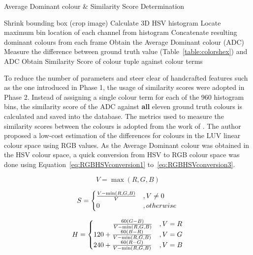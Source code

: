 \begin{algorithm}[H]
  \caption{Average Dominant colour \& Similarity Score Determination}
  \label{algo:ADC}
  \begin{algorithmic}[1]
        \STATE Shrink bounding box (crop image)
        \STATE Calculate 3D HSV histogram
        \STATE Locate maximum bin location of each channel from histogram
        \STATE Concatenate resulting dominant colours from each frame
        \STATE Obtain the Average Dominant colour (ADC)
        \STATE Measure the difference between ground truth value (Table~\ref{table:colorshex}) and ADC
        \STATE Obtain Similarity Score of colour tuple against colour terms
    \ENDFOR
  \end{algorithmic}
\end{algorithm}

To reduce the number of parameters and steer clear of handcrafted features such as the one introduced in Phase 1, the usage of similarity scores were adopted in Phase 2.
Instead of assigning a single colour term for each of the 960 histogram bins, the similarity score of the ADC against \textbf{all} eleven ground truth colours is calculated and saved into the database. The metrics used to measure the similarity scores between the colours is adopted from the work of . The author proposed a low-cost estimation of the differences for colours in the LUV linear colour space using RGB values. As the Average Dominant colour was obtained in the HSV colour space, a quick conversion from HSV to RGB colour space was done using Equation~\ref{eq:RGBHSVconversion1} to~\ref{eq:RGBHSVconversion3}.



\begin{equation}
\label{eq:RGBHSVconversion1}
V = \max(R,G,B)
\end{equation}

\begin{equation}
\label{eq:RGBHSVconversion2}
S = \begin{cases}\frac{V - \min(R,G,B)}{V} & , V \neq 0\\
0 & , otherwise \end{cases} \\
\end{equation}

\begin{equation}
\label{eq:RGBHSVconversion3}
H = \begin{cases}
\hspace{2.8em} \frac{60(G-B)}{V-\min(R,G,B)} & ,V = R\\
120 + \frac{60(B-R)}{V-\min(R,G,B)} & ,V = G\\
240 + \frac{60(R-G)}{V-\min(R,G,B)} & ,V = B
\end{cases}
\end{equation}

